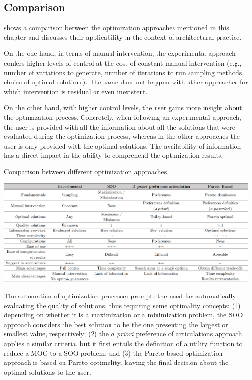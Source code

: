 	\subsection{Comparison}
	 shows a comparison between the optimization approaches mentioned in this chapter and discusses their applicability in the context of architectural practice.
	 
	On the one hand, in terms of manual intervention, the experimental approach confers higher levels of control at the cost of constant manual intervention (e.g., number of variations to generate, number of iterations to run sampling methods, choice of optimal solutions). The same does not happen with other approaches for which intervention is residual or even inexistent.	
	
	On the other hand, with higher control levels, the user gains more insight about the optimization process. Concretely, when following an experimental approach, the user is provided with all the information about all the solutions that were evaluated during the optimization process, whereas in the other approaches the user is only provided with the optimal solutions. The availability of information has a direct impact in the ability to comprehend the optimization results.
	\begin{table}
		\centering
		\caption{Comparison between different optimization approaches.}
		\includegraphics[width=1\textwidth]{tables_and_code/approaches_comparison.PNG}
		\label{table:optapproach}
	\end{table}

	The automation of optimization processes prompts the need for automatically evaluating the quality of solutions, thus requiring some optimality concepts: (1) depending on whether it is a maximization or a minimization problem, the \ac{SOO} approach considers the best solution to be the one presenting the largest or smallest value, respectively; (2) the \textit{a priori} preference of articulations approach applies a similar criteria, but it first entails the definition of a utility function to reduce a \ac{MOO} to a \ac{SOO} problem; and (3) the Pareto-based optimization approach is based on Pareto optimality, leaving the final decision about the optimal solutions to the user.
	
